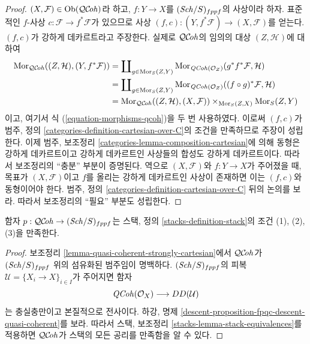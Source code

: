 \begin{proof}
$(X, \mathcal{F}) \in \mathop{\mathrm{Ob}}\nolimits(\mathcal{QC}\!\mathit{oh})$라 하고,
$f : Y \to X$를 $(\mathit{Sch}/S)_{fppf}$의 사상이라 하자. 표준적인 $f$-사상
$c : \mathcal{F} \to f^*\mathcal{F}$가 있으므로 사상
$(f, c) : (Y, f^*\mathcal{F}) \to (X, \mathcal{F})$를 얻는다.
$(f, c)$가 강하게 데카르트라고 주장한다. 실제로 $\mathcal{QC}\!\mathit{oh}$의 임의의
대상 $(Z, \mathcal{H})$에 대하여
\begin{align*}
\mathop{\mathrm{Mor}}\nolimits_{\mathcal{QC}\!\mathit{oh}}((Z, \mathcal{H}), (Y, f^*\mathcal{F}))
& =
\coprod\nolimits_{g \in \mathop{\mathrm{Mor}}\nolimits_S(Z, Y)}
\mathop{\mathrm{Mor}}\nolimits_{\mathit{QCoh}(\mathcal{O}_Z)}(g^*f^*\mathcal{F}, \mathcal{H}) \\
& =
\coprod\nolimits_{g \in \mathop{\mathrm{Mor}}\nolimits_S(Z, Y)}
\mathop{\mathrm{Mor}}\nolimits_{\mathit{QCoh}(\mathcal{O}_Z)}((f \circ g)^*\mathcal{F}, \mathcal{H}) \\
& =
\mathop{\mathrm{Mor}}\nolimits_{\mathcal{QC}\!\mathit{oh}}((Z, \mathcal{H}), (X, \mathcal{F}))
\times_{\mathop{\mathrm{Mor}}\nolimits_S(Z, X)} \mathop{\mathrm{Mor}}\nolimits_S(Z, Y)
\end{align*}
이고, 여기서 식 (\ref{equation-morphisms-qcoh})을 두 번 사용하였다. 이로써
$(f, c)$가 범주, 정의 \ref{categories-definition-cartesian-over-C}의 조건을
만족하므로 주장이 성립한다. 이제 범주, 보조정리
\ref{categories-lemma-composition-cartesian}에 의해 동형은 강하게
데카르트이고 강하게 데카르트인 사상들의 합성도 강하게 데카르트이다.
따라서 보조정리의 ``충분'' 부분이 증명된다. 역으로 $(X, \mathcal{F})$와
$f : Y \to X$가 주어졌을 때, 목표가 $(X, \mathcal{F})$이고 $f$를 올리는
강하게 데카르트인 사상이 존재하면 이는 $(f, c)$와 동형이어야 한다. 범주,
정의 \ref{categories-definition-cartesian-over-C} 뒤의 논의를 보라. 따라서
보조정리의 ``필요'' 부분도 성립한다.
\end{proof}

\begin{lemma}
\label{lemma-stack-of-quasi-coherent-sheaves}
함자 $p : \mathcal{QC}\!\mathit{oh} \to (\mathit{Sch}/S)_{fppf}$는 스택, 정의
\ref{stacks-definition-stack}의 조건 (1), (2), (3)을 만족한다.
\end{lemma}

\begin{proof}
보조정리 \ref{lemma-quasi-coherent-strongly-cartesian}에서
$\mathcal{QC}\!\mathit{oh}$가 $(\mathit{Sch}/S)_{fppf}$ 위의 섬유화된 범주임이 명백하다.
$(\mathit{Sch}/S)_{fppf}$의 피복
$\mathcal{U} = \{X_i \to X\}_{i \in I}$가 주어지면 함자
$$
\mathit{QCoh}(\mathcal{O}_X) \longrightarrow DD(\mathcal{U})
$$
는 충실충만이고 본질적으로 전사이다. 하강, 명제
\ref{descent-proposition-fpqc-descent-quasi-coherent}를 보라. 따라서 스택,
보조정리 \ref{stacks-lemma-stack-equivalences}를 적용하면 $\mathcal{QC}\!\mathit{oh}$가
스택의 모든 공리를 만족함을 알 수 있다.
\end{proof}





